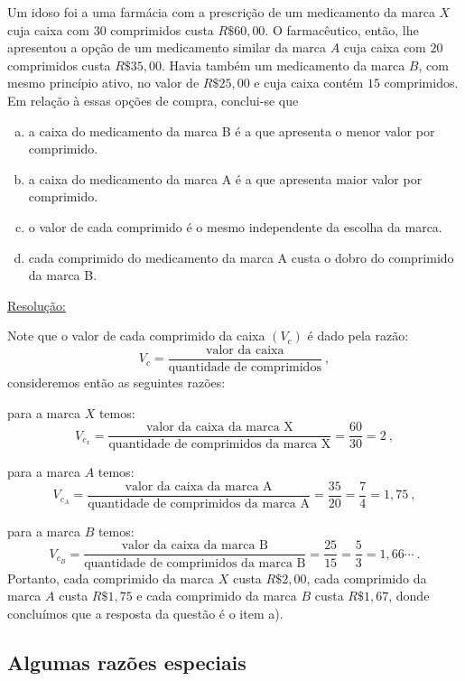 \begin{exem}[Comperve - 2018]
 Um idoso foi a uma farmácia com a prescrição de um medicamento da marca $X$ cuja caixa com $30$ comprimidos custa $R\$ 60,00$. O farmacêutico, então, lhe apresentou a opção de um medicamento similar da marca $A$ cuja caixa com $20$ comprimidos custa $R\$ 35,00$. Havia também um medicamento da marca $B$, com mesmo princípio ativo, no valor de $R\$ 25,00$ e cuja caixa contém $15$ comprimidos. Em relação à essas opções de compra, conclui-se que

 \begin{enumerate}[a)]
  \item a caixa do medicamento da marca B é a que apresenta o menor valor por comprimido.
  \item a caixa do medicamento da marca A é a que apresenta maior valor por comprimido.
  \item o valor de cada comprimido é o mesmo independente da escolha da marca.
  \item cada comprimido do medicamento da marca A custa o dobro do comprimido da marca B.
 \end{enumerate}

\underline{Resolução:}

  Note que o valor de cada comprimido da caixa $(V_c)$ é dado pela razão:
  \[V_c= \frac{\text{valor da caixa}}{\text{quantidade de comprimidos}} \ ,\]
  consideremos então as seguintes razões:

  para a marca $X$ temos:
  \[V_{c_x}=\frac{\text{valor da caixa da marca X}}{\text{quantidade de comprimidos da marca X}}= \frac{60}{30}= 2 \ ,\]

  para a marca $A$ temos:
   \[V_{c_A}=\frac{\text{valor da caixa da marca A}}{\text{quantidade de comprimidos da marca A}}= \frac{35}{20}= \frac{7}{4}= 1,75 \ ,\]

  para a marca $B$ temos:
  \[V_{c_B}=\frac{\text{valor da caixa da marca B}}{\text{quantidade de comprimidos da marca B}} = \frac{25}{15}= \frac{5}{3}= 1,66 \cdots \ .\]
  Portanto, cada comprimido da marca $X$ custa $R\$ 2,00$, cada comprimido da marca $A$ custa $R\$ 1,75$ e cada comprimido da marca $B$ custa $R\$ 1,67$, donde concluímos que a resposta da questão é o item a).

  \fim
\end{exem}



\subsection{Algumas razões especiais}

